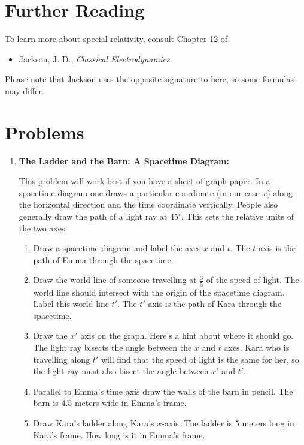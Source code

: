 \section{Further Reading}

To learn more about special relativity, consult Chapter 12
of
\begin{itemize}
\item Jackson, J. D., {\em Classical Electrodynamics}.
\end{itemize}
Please note that Jackson uses the opposite signature to here, so some
formulas may differ.

\section{Problems}

\begin{enumerate}
\item{\bf The Ladder and the Barn: A Spacetime Diagram:}

This problem will work best if you have a sheet of graph paper.
In a spacetime diagram one draws a particular coordinate (in our case
$x$)  along the horizontal direction and the time coordinate
vertically.  People also generally draw the path of a light ray at
45$^\circ$.  This sets the relative units of the two axes.
\begin{enumerate}
\item Draw a spacetime diagram and label the axes $x$ and
  $t$.  The $t$-axis is the path of Emma through the spacetime.

\item Draw the world line of someone travelling at
  $\frac{3}{5}$ of the speed of light.  The world line should
  intersect with the origin of the spacetime diagram.  Label this
  world line $t'$.  The $t'$-axis is the path of Kara through the
  spacetime. 

\item Draw the $x'$ axis on the graph.   Here's a hint about
  where it should go.   The light ray bisects the angle between the
  $x$ and $t$ axes.  Kara who is travelling along $t'$ will find that
  the speed of light is the same for her, so the light ray must also
  bisect the angle between $x'$ and $t'$.

\item Parallel to Emma's time axis draw the walls of the barn
  in pencil.  The barn is 4.5 meters wide in Emma's frame.

\item Draw Kara's ladder along Kara's $x$-axis.   The ladder
is 5 meters long in Kara's frame.  How long is it in Emma's frame.


\end{enumerate}
\end{enumerate}
